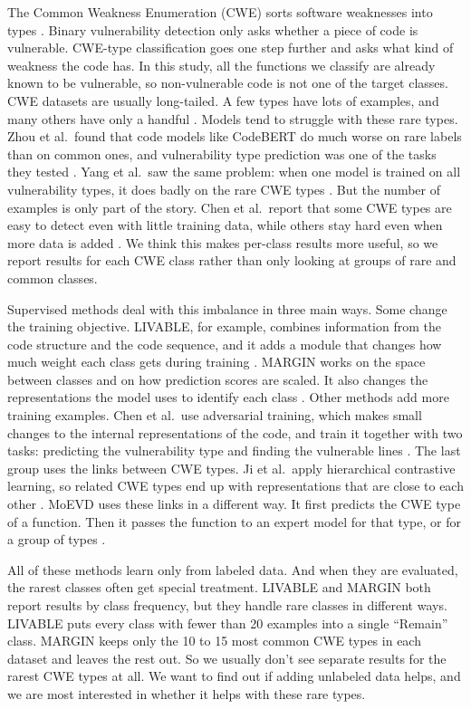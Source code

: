 \documentclass[conference]{IEEEtran}
\begin{document}
The Common Weakness Enumeration (CWE) sorts software weaknesses into
types \cite{mitre-cwe}. Binary vulnerability detection only asks whether
a piece of code is vulnerable. CWE-type classification goes one step
further and asks what kind of weakness the code has. In this study, all
the functions we classify are already known to be vulnerable, so
non-vulnerable code is not one of the target classes. CWE datasets are
usually long-tailed. A few types have lots of examples, and many others
have only a handful \cite{wen2023livable,zhou2023devil}. Models tend to
struggle with these rare types. Zhou et al.~found that code models like
CodeBERT do much worse on rare labels than on common ones, and
vulnerability type prediction was one of the tasks they tested
\cite{zhou2023devil}. Yang et al.~saw the same problem: when one model
is trained on all vulnerability types, it does badly on the rare CWE
types \cite{yang2025moevd}. But the number of examples is only part of
the story. Chen et al.~report that some CWE types are easy to detect
even with little training data, while others stay hard even when more
data is added \cite{chen2023diversevul}. We think this makes per-class
results more useful, so we report results for each CWE class rather than
only looking at groups of rare and common classes.

Supervised methods deal with this imbalance in three main ways. Some
change the training objective. LIVABLE, for example, combines
information from the code structure and the code sequence, and it adds a
module that changes how much weight each class gets during training
\cite{wen2023livable}. MARGIN works on the space between classes and on
how prediction scores are scaled. It also changes the representations
the model uses to identify each class \cite{zhang2026margin}. Other
methods add more training examples. Chen et al.~use adversarial
training, which makes small changes to the internal representations of
the code, and train it together with two tasks: predicting the
vulnerability type and finding the vulnerable lines \cite{chen2025edat}.
The last group uses the links between CWE types. Ji et al.~apply
hierarchical contrastive learning, so related CWE types end up with
representations that are close to each other \cite{ji2024contrastive}.
MoEVD uses these links in a different way. It first predicts the CWE
type of a function. Then it passes the function to an expert model for
that type, or for a group of types \cite{yang2025moevd}.

All of these methods learn only from labeled data. And when they are
evaluated, the rarest classes often get special treatment. LIVABLE and
MARGIN both report results by class frequency, but they handle rare
classes in different ways. LIVABLE puts every class with fewer than 20
examples into a single ``Remain'' class. MARGIN keeps only the 10 to 15
most common CWE types in each dataset and leaves the rest out. So we
usually don't see separate results for the rarest CWE types at all. We
want to find out if adding unlabeled data helps, and we are most
interested in whether it helps with these rare types.
\end{document}
